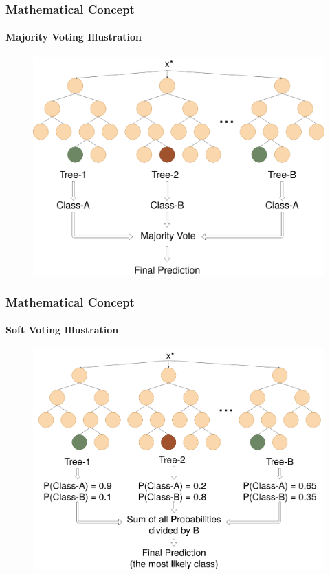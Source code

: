\begin{frame}
    \frametitle{Mathematical Concept}
    \framesubtitle{Majority Voting Illustration}
    \begin{figure}
        \includegraphics[height=0.7\textheight]{images/majority.png}
    \end{figure}
\end{frame}
\begin{frame}
    \frametitle{Mathematical Concept}
    \framesubtitle{Soft Voting Illustration}
    \begin{figure}
        \includegraphics[height=0.7\textheight]{images/soft.png}
    \end{figure}
\end{frame}
